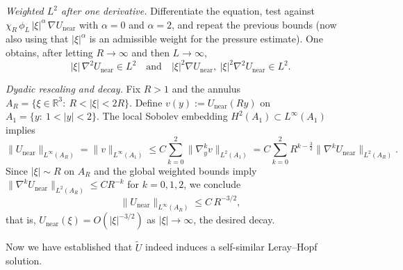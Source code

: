 \documentclass[11pt,a4paper]{article}
\numberwithin{equation}{section}
\begin{document}
\smallskip
\noindent\emph{Weighted $L^2$ after one derivative.}
Differentiate the equation, test against $\chi_R\,\phi_L\,|\xi|^\alpha\,\nabla U_{\mathrm{near}}$ with $\alpha=0$ and $\alpha=2$, and repeat the previous bounds (now also using that $|\xi|^\alpha$ is an admissible weight for the pressure estimate). One obtains, after letting $R\to\infty$ and then $L\to\infty$,
\[
|\xi|\,\nabla^2 U_{\mathrm{near}}\in L^2
\quad\text{and}\quad
|\xi|^2\nabla U_{\mathrm{near}},\ |\xi|^2\nabla^2 U_{\mathrm{near}}\in L^2.
\]

\smallskip
\noindent\emph{Dyadic rescaling and decay.} Fix $R>1$ and the annulus $A_R=\{\xi\in\mathbb{R}^3:\ R<|\xi|<2R\}$.
Define $v(y):=U_{\mathrm{near}}(R y)$ on $A_1=\{y:\ 1<|y|<2\}$. The local Sobolev embedding $H^2(A_1)\subset L^\infty(A_1)$ implies
\[
\|U_{\mathrm{near}}\|_{L^\infty(A_R)}
=\|v\|_{L^\infty(A_1)}
\leqslant C\sum_{k=0}^2\|\nabla_y^k v\|_{L^2(A_1)}
= C\sum_{k=0}^2 R^{k-\frac32}\|\nabla^k U_{\mathrm{near}}\|_{L^2(A_R)}.
\]
Since $|\xi|\sim R$ on $A_R$ and the global weighted bounds imply
$\|\nabla^k U_{\mathrm{near}}\|_{L^2(A_R)}\leqslant C R^{-k}$ for $k=0,1,2$, we conclude
\[
\|U_{\mathrm{near}}\|_{L^\infty(A_R)}\leqslant C\,R^{-3/2},
\]
that is, $U_{\mathrm{near}}(\xi)=O(|\xi|^{-3/2})$ as $|\xi|\to\infty$, the desired decay.




Now we have established that $\widetilde{U}$ indeed induces a self-similar Leray--Hopf solution.
\end{document}
